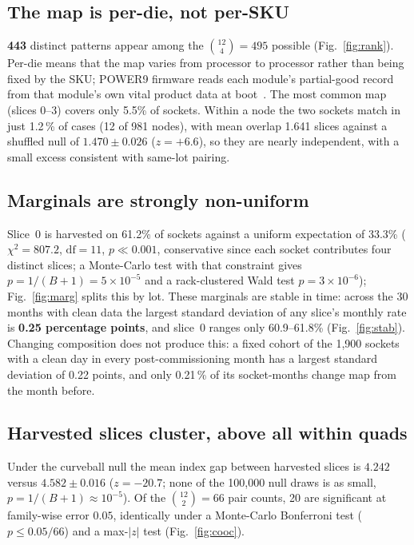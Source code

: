 \documentclass[10pt,conference]{IEEEtran}
\begin{document}
\subsection{The map is per-die, not per-SKU}
\textbf{443} distinct patterns appear among the $\binom{12}{4}=495$ possible
(Fig.~\ref{fig:rank}). Per-die means that the map varies from processor to processor rather than
being fixed by the SKU; POWER9 firmware reads each module's partial-good record from that module's
own vital product data at boot~\cite{hostboot_p9}. The most common map (slices 0--3) covers only
5.5\% of sockets. Within a node the two sockets match in just 1.2\,\% of cases (12 of 981 nodes),
with mean overlap 1.641 slices against a shuffled null of $1.470\pm0.026$ ($z=+6.6$), so they are
nearly independent, with a small excess consistent with same-lot pairing.


\subsection{Marginals are strongly non-uniform}
Slice~0 is harvested on 61.2\% of sockets against a uniform expectation of 33.3\%
($\chi^2=807.2$, $\mathrm{df}=11$, $p\ll0.001$, conservative since each socket contributes four
distinct slices; a Monte-Carlo test with that constraint gives $p=1/(B+1)=5\times10^{-5}$ and a
rack-clustered Wald test $p=3\times10^{-6}$); Fig.~\ref{fig:marg} splits this by lot. These
marginals are stable in time: across the 30 months with clean data the largest standard deviation
of any slice's monthly rate is \textbf{0.25 percentage points}, and slice~0 ranges only
60.9--61.8\% (Fig.~\ref{fig:stab}). Changing composition does not produce this: a fixed cohort of
the 1{,}900 sockets with a clean day in every post-commissioning month has a largest standard
deviation of 0.22 points, and only 0.21\,\% of its socket-months change map from the month before.


\subsection{Harvested slices cluster, above all within quads}
\label{sec:cluster}
Under the curveball null the mean index gap between harvested slices is $4.242$ versus
$4.582\pm0.016$ ($z=-20.7$; none of the 100{,}000 null draws is as small, $p=1/(B+1)\approx10^{-5}$).
Of the $\binom{12}{2}=66$ pair counts, 20 are significant at family-wise error $0.05$, identically
under a Monte-Carlo Bonferroni test ($p\le0.05/66$) and a max-$|z|$ test (Fig.~\ref{fig:cooc}).
\end{document}
